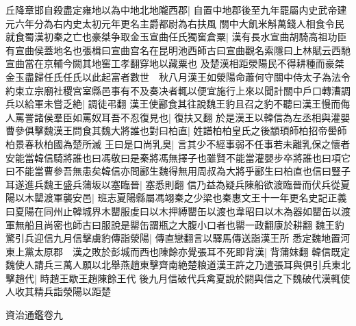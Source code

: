 丘降章邯自殺盡定雍地以為中地北地隴西郡|{
	自置中地郡後至九年罷屬内史武帝建元六年分為右内史太初元年更名主爵都尉為右扶風}
關中大飢米斛萬錢人相食令民就食蜀漢初秦之亡也豪桀争取金玉宣曲任氏獨窖倉粟|{
	漢有長水宣曲胡騎高祖功臣有宣曲侯蓋地名也張楫曰宣曲宫名在昆明池西師古曰宣曲觀名索隱曰上林賦云西馳宣曲當在京輔今闕其地窖工孝翻穿地以藏粟也}
及楚漢相距滎陽民不得耕種而豪桀金玉盡歸任氏任氏以此起富者數世　秋八月漢王如滎陽命蕭何守關中侍太子為法令約束立宗廟社稷宫室縣邑事有不及奏决者輒以便宜施行上來以聞計關中戶口轉漕調兵以給軍未嘗乏絶|{
	調徒弔翻}
漢王使酈食其往說魏王豹且召之豹不聽曰漢王慢而侮人罵詈諸侯羣臣如罵奴耳吾不忍復見也|{
	復扶又翻}
於是漢王以韓信為左丞相與灌嬰曹參俱擊魏漢王問食其魏大將誰也對曰柏直|{
	姓譜柏柏皇氏之後顓頊師柏招帝嚳師柏景春秋柏國為楚所滅}
王曰是口尚乳臭|{
	言其少不經事弱不任事若未離乳保之懷者}
安能當韓信騎將誰也曰馮敬曰是秦將馮無擇子也雖賢不能當灌嬰步卒將誰也曰項它曰不能當曹參吾無患矣韓信亦問酈生魏得無用周叔為大將乎酈生曰柏直也信曰豎子耳遂進兵魏王盛兵蒲坂以塞臨晉|{
	塞悉則翻}
信乃益為疑兵陳船欲渡臨晉而伏兵從夏陽以木罌渡軍襲安邑|{
	班志夏陽縣屬馮翊秦之少梁也秦惠文王十一年更名史記正義曰夏陽在同州止韓城界木罌服䖍曰以木押縛罌缶以渡也韋昭曰以木為器如罌缶以渡軍無船且尚密也師古曰服說是罌缶謂瓶之大腹小口者也罌一政翻康於耕翻}
魏王豹驚引兵迎信九月信擊虜豹傳詣滎陽|{
	傳直戀翻言以驛馬傳送詣漢王所}
悉定魏地置河東上黨太原郡　漢之敗於彭城而西也陳餘亦覺張耳不死即背漢|{
	背蒲妺翻}
韓信既定魏使人請兵三萬人願以北舉燕趙東擊齊南絶楚粮道漢王許之乃遣張耳與俱引兵東北擊趙代|{
	時趙王歇王趙陳餘王代}
後九月信破代兵禽夏說於閼與信之下魏破代漢輒使人收其精兵詣滎陽以距楚

資治通鑑卷九
